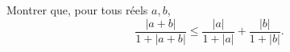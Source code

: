 Montrer que, pour tous réels $a, b$,
\[ \frac{|a + b|}{1 + |a + b|} \leq \frac{|a|}{1 + |a|} + \frac{|b|}{1 + |b|}. \]
